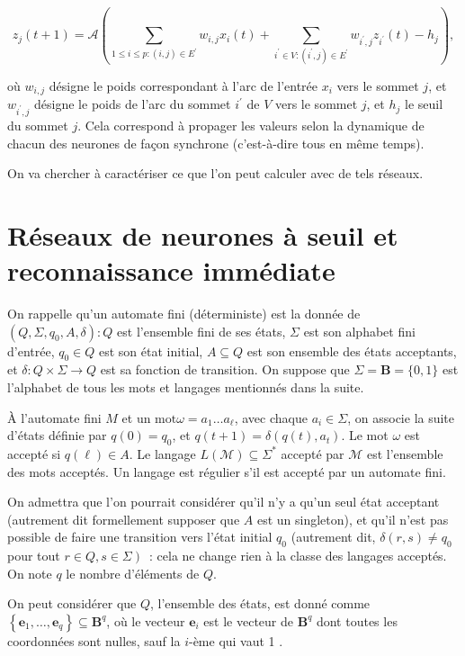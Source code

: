 \documentclass[10pt]{article}
\begin{document}
$$
z_{j}(t+1)=\mathcal{A}\left(\sum_{1 ≤ i ≤ p:(i, j) \in E^{\prime}} w_{i, j} x_{i}(t)+\sum_{i^{\prime} \in V:\left(i^{\prime}, j\right) \in E^{\prime}} w_{i^{\prime}, j} z_{i^{\prime}}(t)-h_{j}\right),
$$

où $w_{i, j}$ désigne le poids correspondant à l'arc de l'entrée $x_{i}$ vers le sommet $j$, et $w_{i^{\prime}, j}$ désigne le poids de l'arc du sommet $i^{\prime}$ de $V$ vers le sommet $j$, et $h_{j}$ le seuil du sommet $j$. Cela correspond à propager les valeurs selon la dynamique de chacun des neurones de façon synchrone (c'est-à-dire tous en même temps).

On va chercher à caractériser ce que l'on peut calculer avec de tels réseaux.

\section{Réseaux de neurones à seuil et reconnaissance immédiate}
On rappelle qu'un automate fini (déterministe) est la donnée de $\left(Q, Σ, q_{0}, A, δ\right): Q$ est l'ensemble fini de ses états, $Σ$ est son alphabet fini d'entrée, $q_{0} \in Q$ est son état initial, $A \subseteq Q$ est son ensemble des états acceptants, et $δ: Q \times Σ → Q$ est sa fonction de transition. On suppose que $Σ=\mathbf{B}=\{0,1\}$ est l'alphabet de tous les mots et langages mentionnés dans la suite.

À l'automate fini $M$ et un $\mathrm{mot} \omega=a_{1} \ldots a_{\ell}$, avec chaque $a_{i} \in Σ$, on associe la suite d'états définie par $q(0)=q_{0}$, et $q(t+1)=δ\left(q(t), a_{t}\right)$. Le mot $\omega$ est accepté si $q(\ell) \in A$. Le langage $L(\mathcal{M}) \subseteq Σ^{*}$ accepté par $\mathcal{M}$ est l'ensemble des mots acceptés. Un langage est régulier s'il est accepté par un automate fini.

On admettra que l'on pourrait considérer qu'il n'y a qu'un seul état acceptant (autrement dit formellement supposer que $A$ est un singleton), et qu'il n'est pas possible de faire une transition vers l'état initial $q_{0}$ (autrement dit, $δ(r, s) \neq q_{0}$ pour tout $\left.r \in Q, s \in Σ\right)$ : cela ne change rien à la classe des langages acceptés. On note $q$ le nombre d'éléments de $Q$.

On peut considérer que $Q$, l'ensemble des états, est donné comme $\left\{\mathbf{e}_{1}, \ldots, \mathbf{e}_{q}\right\} \subseteq \mathbf{B}^{q}$, où le vecteur $\mathbf{e}_{i}$ est le vecteur de $\mathbf{B}^{q}$ dont toutes les coordonnées sont nulles, sauf la $i$-ème qui vaut 1 .
\end{document}
